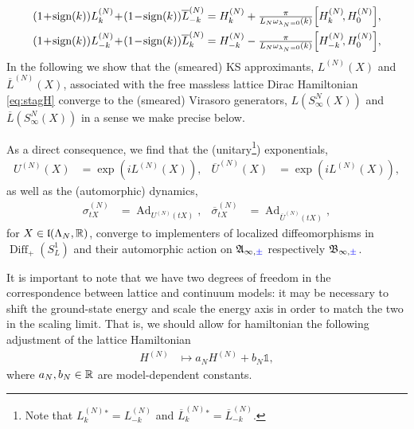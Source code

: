 \documentclass[a4paper, 11pt]{article}
\newcommand{\fA}{\mathfrak{A}}\newcommand{\cA}{\mathcal{A}}\newcommand{\dA}{\mathds{A}}\newcommand{\sA}{\mathscr{A}}
\newcommand{\fB}{\mathfrak{B}}\newcommand{\cB}{\mathcal{B}}\newcommand{\dB}{\mathds{B}}\newcommand{\sB}{\mathscr{B}}
\newcommand{\fl}{\mathfrak{l}}\newcommand{\cl}{\mathcal{l}}
\DeclareMathOperator{\Ad}{Ad}
\DeclareMathOperator{\1}{\mathds{1}}
\DeclareMathOperator{\Diff}{Diff}
\DeclareMathOperator{\sign}{\textup{sign}}
\begin{document}
\begin{align}
\label{eq:latvira}
(1\!+\!\sign(k))L_{k}^{(N)}\!+\!(1\!-\!\sign(k))\overline{L}_{-k}^{(N)} & = H_{k}^{(N)} + \tfrac{\pi}{L_{N} \omega_{\lambda_{N}=0}(k)}\Big[H_{k}^{(N)}\!,H_0^{(N)}\Big], \\ \nonumber
(1\!+\!\sign(k))L_{-k}^{(N)}\!+\!(1\!-\!\sign(k))\overline{L}_{k}^{(N)} & = H_{-k}^{(N)} - \tfrac{\pi}{L_{N} \omega_{\lambda_{N}=0}(k)}\Big[H_{-k}^{(N)}\!,H_0^{(N)}\Big],
\end{align}
In the following we show that the (smeared) KS approximants, $L^{(N)}(X)$ and $\overline{L}^{(N)}(X)$, associated with the free massless lattice Dirac Hamiltonian \eqref{eq:stagH} converge to the (smeared) Virasoro generators, $L(S^{N}_{\infty}(X))$ and $\overline{L}(S^{N}_{\infty}(X))$ in a sense we make precise below.

As a direct consequence, we find that the (unitary\footnote{Note that $L^{(N)}_{k}{}^{*} = L^{(N)}_{-k}$ and $\overline{L}^{(N)}_{k}{}^{*} = \overline{L}^{(N)}_{-k}$.}) exponentials,
\begin{align}
\label{eq:latviraexp}
U^{(N)}(X) & = \exp(iL^{(N)}(X)), & \overline{U}^{(N)}(X) & = \exp(iL^{(N)}(X)),
\end{align}
as well as the (automorphic) dynamics,
\begin{align}
\label{eq:latviradyn}
\sigma^{(N)}_{tX} & =  \Ad_{U^{(N)}(tX)}, & \overline{\sigma}^{(N)}_{tX} & =  \Ad_{\overline{U}^{(N)}(tX)},
\end{align}
for $X\in\fl(\Lambda_{N},\R)$, converge to implementers of localized diffeomorphisms in $\Diff_{+}(S^{1}_{L})$ and their automorphic action on $\fA_{\infty,{\color{blue}\pm}}$ respectively $\fB_{\infty,{\color{blue}\pm}}$.

It is important to note that we have two degrees of freedom in the correspondence between lattice and continuum models: it may be necessary to shift the ground-state energy and scale the energy axis in order to match the two in the scaling limit. That is, we should allow for hamiltonian the following adjustment of the lattice Hamiltonian
\begin{align}
\label{eq:scaleshift}
H^{(N)} & \mapsto a_{N} H^{(N)} + b_{N} \mathds{1},
\end{align}  
where $a_{N}, b_{N}\in\mathbb{R}$ are model-dependent constants.
\end{document}
